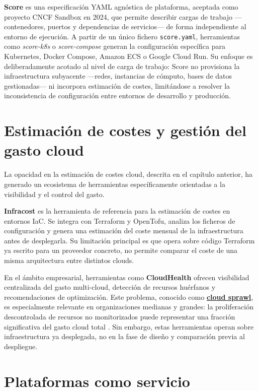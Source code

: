 \textbf{Score} \cite{scoreDocs} es una especificación YAML agnóstica de plataforma,
aceptada como proyecto CNCF Sandbox en 2024, que permite describir cargas de trabajo
—contenedores, puertos y dependencias de servicios— de forma independiente al
entorno de ejecución. A partir de un único fichero \texttt{score.yaml}, herramientas
como \textit{score-k8s} o \textit{score-compose} generan la configuración específica
para Kubernetes, Docker Compose, Amazon ECS o Google Cloud Run. Su enfoque es
deliberadamente acotado al nivel de carga de trabajo: Score no provisiona la
infraestructura subyacente —redes, instancias de cómputo, bases de datos
gestionadas— ni incorpora estimación de costes, limitándose a resolver la
inconsistencia de configuración entre entornos de desarrollo y producción.

\section{Estimación de costes y gestión del gasto cloud}

La opacidad en la estimación de costes cloud, descrita en el capítulo anterior,
ha generado un ecosistema de herramientas específicamente orientadas a la
visibilidad y el control del gasto.

\textbf{Infracost} \cite{infracostDocs} es la herramienta de referencia para
la estimación de costes en entornos IaC. Se integra con Terraform y OpenTofu,
analiza los ficheros de configuración y genera una estimación del coste mensual
de la infraestructura antes de desplegarla. Su limitación principal es que opera
sobre código Terraform ya escrito para un proveedor concreto, no permite
comparar el coste de una misma arquitectura entre distintos clouds.

En el ámbito empresarial, herramientas como \textbf{CloudHealth}
\cite{cloudHealthDocs} ofrecen visibilidad centralizada del gasto multi-cloud,
detección de recursos huérfanos y recomendaciones de optimización. Este problema,
conocido como \hyperlink{cloud-sprawl}{\textbf{cloud sprawl}}, es especialmente relevante en organizaciones
medianas y grandes: la proliferación descontrolada de recursos no monitorizados
puede representar una fracción significativa del gasto cloud total \cite{flexera2026}.
Sin embargo, estas herramientas operan sobre infraestructura ya desplegada, no
en la fase de diseño y comparación previa al despliegue.

\section{Plataformas como servicio}

